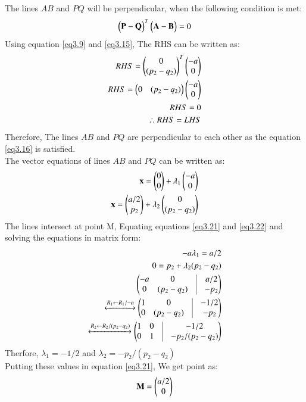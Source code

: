 \documentclass[journal,12pt,twocolumn]{IEEEtran}
\begin{document}
The lines $AB$ and $PQ$ will be perpendicular, when the following condition is met:
\begin{align}
    \begin{pmatrix}\mathbf{P}-\mathbf{Q}\end{pmatrix}^T\begin{pmatrix}\mathbf{A}-\mathbf{B}\end{pmatrix}=0\label{eq3.16}
\end{align}
Using equation \ref{eq3.9} and \ref{eq3.15}, The RHS can be written as:
\begin{align}
  RHS=\begin{pmatrix}0 \\ (p_2-q_2)\end{pmatrix}^T\begin{pmatrix}-a \\ 0\end{pmatrix}\\
  RHS=\begin{pmatrix}0 & (p_2-q_2)\end{pmatrix}\begin{pmatrix}-a \\ 0\end{pmatrix}\\
  RHS = 0\\
  \therefore RHS=LHS
\end{align}
Therefore, The lines $AB$ and $PQ$ are perpendicular to each other as the equation \ref{eq3.16} is satisfied. \\
The vector equations of lines $AB$ and $PQ$ can be written as:
\begin{align}
\mathbf{x}=\begin{pmatrix}0\\0\end{pmatrix}+ \lambda_1 \begin{pmatrix}-a \\ 0\end{pmatrix}\label{eq3.21}\\
\mathbf{x}=\begin{pmatrix}a/2\\p_2\end{pmatrix}+ \lambda_2 \begin{pmatrix}0 \\ (p_2-q_2)\end{pmatrix} \label{eq3.22}
\end{align}
The lines intersect at point M, Equating equations \ref{eq3.21} and \ref{eq3.22} and solving the equations in matrix form:
\begin{align}
-a\lambda_1=a/2\\
0= p_2+ \lambda_2 (p_2-q_2)\\
\myvec{-a & 0 &\vrule & a/2\\0 & (p_2-q_2) &\vrule& -p_2}\\
\xleftrightarrow[]{R_1\leftarrow R_1/-a}
\myvec{1 & 0 &\vrule & -1/2\\0 & (p_2-q_2) &\vrule& -p_2}\\
\xleftrightarrow[]{R_2\leftarrow R_2/(p_2-q_2)}
\myvec{1 & 0 &\vrule & -1/2\\0 & 1 &\vrule& -p_2/(p_2-q_2)}
\end{align}
Therfore, $\lambda_1 = -1/2$ and $\lambda_2=-p_2/(p_2-q_2)$\\
Putting these values in equation \ref{eq3.21}, We get point  as:
\begin{align}
\mathbf{M}=\begin{pmatrix}a/2\\0\end{pmatrix}
\end{align}
\end{document}
